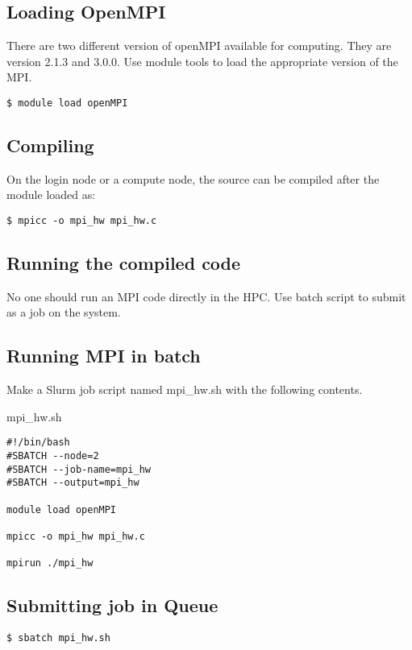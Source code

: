 \documentclass[11pt]{article}
\numberwithin{figure}{section}
\begin{document}
\subsection{Loading OpenMPI}
There are two different version of openMPI available for computing. They are
version 2.1.3 and 3.0.0. Use module tools to load the appropriate version of
the MPI.

\begin{lstlisting}[frame=single]
$ module load openMPI
\end{lstlisting}

\subsection{Compiling}
On the login node or a compute node, the source can be compiled after the
module loaded as:

\begin{lstlisting}[frame=single]
$ mpicc -o mpi_hw mpi_hw.c
\end{lstlisting}

\subsection{Running the compiled code}
No one should run an MPI code directly in the HPC. Use batch script to submit
as a job on the system.

\subsection{Running MPI in batch}
Make a Slurm job script named mpi\_hw.sh with the following contents.

mpi\_hw.sh

\begin{lstlisting}[frame=single]
#!/bin/bash
#SBATCH --node=2
#SBATCH --job-name=mpi_hw
#SBATCH --output=mpi_hw

module load openMPI

mpicc -o mpi_hw mpi_hw.c

mpirun ./mpi_hw
\end{lstlisting}


\subsection{Submitting job in Queue}

\begin{lstlisting}[frame=single]
$ sbatch mpi_hw.sh
\end{lstlisting}
\end{document}

